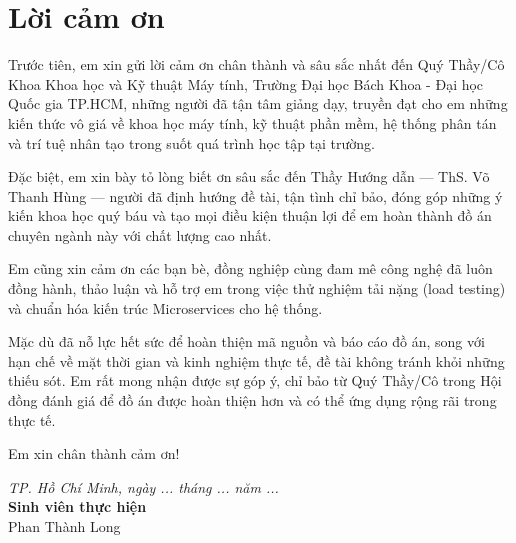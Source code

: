 \section*{Lời cảm ơn}
\thispagestyle{empty}

Trước tiên, em xin gửi lời cảm ơn chân thành và sâu sắc nhất đến Quý Thầy/Cô Khoa Khoa học và Kỹ thuật Máy tính, Trường Đại học Bách Khoa - Đại học Quốc gia TP.HCM, những người đã tận tâm giảng dạy, truyền đạt cho em những kiến thức vô giá về khoa học máy tính, kỹ thuật phần mềm, hệ thống phân tán và trí tuệ nhân tạo trong suốt quá trình học tập tại trường.

Đặc biệt, em xin bày tỏ lòng biết ơn sâu sắc đến Thầy Hướng dẫn --- ThS. Võ Thanh Hùng --- người đã định hướng đề tài, tận tình chỉ bảo, đóng góp những ý kiến khoa học quý báu và tạo mọi điều kiện thuận lợi để em hoàn thành đồ án chuyên ngành này với chất lượng cao nhất.

Em cũng xin cảm ơn các bạn bè, đồng nghiệp cùng đam mê công nghệ đã luôn đồng hành, thảo luận và hỗ trợ em trong việc thử nghiệm tải nặng (load testing) và chuẩn hóa kiến trúc Microservices cho hệ thống.

Mặc dù đã nỗ lực hết sức để hoàn thiện mã nguồn và báo cáo đồ án, song với hạn chế về mặt thời gian và kinh nghiệm thực tế, đề tài không tránh khỏi những thiếu sót. Em rất mong nhận được sự góp ý, chỉ bảo từ Quý Thầy/Cô trong Hội đồng đánh giá để đồ án được hoàn thiện hơn và có thể ứng dụng rộng rãi trong thực tế.

Em xin chân thành cảm ơn!

\vspace{1.5cm}
\begin{flushright}
\textit{TP. Hồ Chí Minh, ngày ... tháng ... năm ...}\\
\textbf{Sinh viên thực hiện}\\
\vspace{1.5cm}
Phan Thành Long
\end{flushright}

\clearpage
{}
